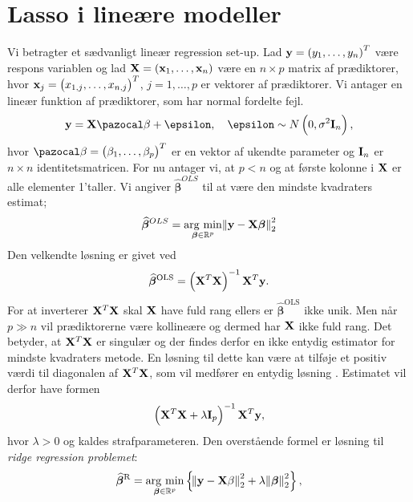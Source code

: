 \chapter{Lasso i lineære modeller}
Vi betragter et sædvanligt lineær regression set-up. Lad $\textbf{y} = \del{y_1, \dots, y_n}^T$ være respons variablen og lad $\textbf{X} = \del{\textbf{x}_1, \dots, \textbf{x}_n}$ være en $n \times p$ matrix af prædiktorer, hvor $\textbf{x}_j = \del{x_{1,j}, \dots, x_{n,j}}^T$, $j = 1, \dots, p$ er vektorer af prædiktorer. 
Vi antager en lineær funktion af prædiktorer, som har normal fordelte fejl. 
\begin{align*}
\textbf{y} = \textbf{X} \mathcal{\beta} + \epsilon, \quad \epsilon \sim N \del{0, \sigma^2 \text{\textbf{I}}_n},
\end{align*}
hvor $\mathcal{\beta} = \del{\beta_1, \dots, \beta_p}^T$ er en vektor af ukendte parameter og $\text{\textbf{I}}_n$ er $n \times n$ identitetsmatricen. 
For nu antager vi, at $p<n$ og at første kolonne i $\mathbf{X}$ er alle elementer 1'taller. 
Vi angiver $\widehat{\boldsymbol{\beta}}^{OLS}$ til at være den mindste kvadraters estimat;
\begin{align*}
\widehat{\boldsymbol{\beta}}^{OLS} = \underset{\boldsymbol\beta \in \mathbb{R}^p}{\operatorname*{\arg\,\min}} \norm{ \textbf{y} - \textbf{X}\boldsymbol\beta}^2_2
\end{align*}
Den velkendte løsning er givet ved 
\begin{align*}
\widehat{\boldsymbol\beta}^{\text{OLS}} = \del{\X^T \X}^{-1} \X^T \y.
\end{align*}
For at inverterer $\mathbf{X}^T \mathbf{X}$ skal $\mathbf{X}$ have fuld rang ellers er $\widehat{\boldsymbol\beta}^{\text{OLS}}$ ikke unik. 
Men når  \(p \gg n\) vil prædiktorerne være kollineære og dermed har \(\mathbf{X}\) ikke fuld rang.
Det betyder, at $\mathbf{X}^T \mathbf{X}$ er singulær og der findes derfor en ikke entydig estimator for mindste kvadraters metode.
En løsning til dette kan være at tilføje et positiv værdi til diagonalen af $\mathbf{X}^T \mathbf{X}$, som vil medfører en entydig løsning . 
Estimatet vil derfor have formen
\begin{align*}
 \del{\X^T \X + \lambda \text{\textbf{I}}_p}^{-1} \X^T \y,
\end{align*}
hvor $\lambda > 0$ og kaldes strafparameteren. Den overstående formel er løsning til \textit{ridge regression problemet}:
\begin{align}
 \widehat{\boldsymbol\beta}^{\text{R}} = \underset{\boldsymbol\beta \in \R^p}{\argmin}  \cbr{\norm{\y - \X\beta}^2_2 + \lambda \norm{\boldsymbol\beta}_2^2},
\end{align} \label{eq:2.8}
